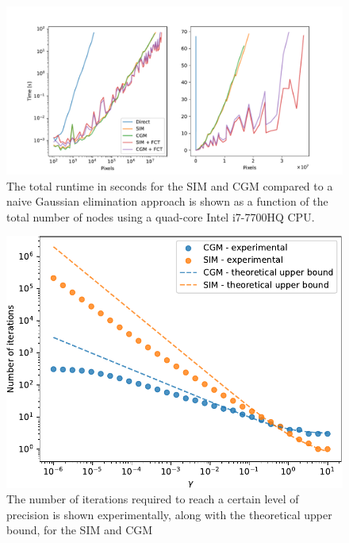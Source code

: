 \begin{figure}[t]
    \hypertarget{runtime}{}
    \label{fig:runtime}
    \begin{center}
        \includegraphics[width=\linewidth]{Figures/SIM_CGM_time.pdf}
    \end{center}
    \caption{\small{ The total runtime in seconds for the SIM and CGM compared to a naive Gaussian elimination approach is shown as a function of the total number of nodes using a quad-core Intel i7-7700HQ CPU. } }
\end{figure}

\begin{figure}[t]
    \hypertarget{complexity}{}
    \label{fig:complexity}
    \begin{center}
        \includegraphics[width=0.7\linewidth]{Figures/complexity.pdf}
    \end{center}
    \caption{\small{The number of iterations required to reach a certain level of precision is shown experimentally, along with the theoretical upper bound, for the SIM and CGM} }
\end{figure}




